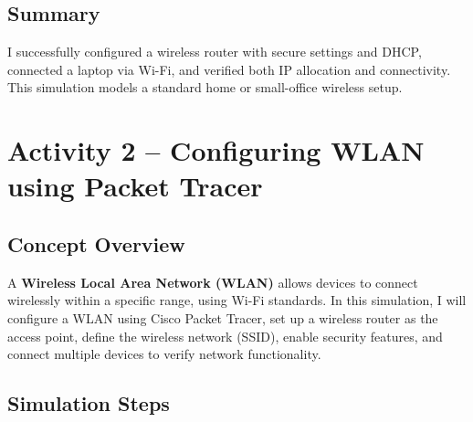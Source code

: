 \documentclass[11pt,a4paper]{article}
\begin{document}
\subsection{Summary}

I successfully configured a wireless router with secure settings and DHCP, connected a laptop via Wi-Fi, and verified both IP allocation and connectivity. This simulation models a standard home or small-office wireless setup.

\section{Activity 2 – Configuring WLAN using Packet Tracer}

\subsection{Concept Overview}

A \textbf{Wireless Local Area Network (WLAN)} allows devices to connect wirelessly within a specific range, using Wi-Fi standards. In this simulation, I will configure a WLAN using Cisco Packet Tracer, set up a wireless router as the access point, define the wireless network (SSID), enable security features, and connect multiple devices to verify network functionality.

\subsection{Simulation Steps}
\end{document}
